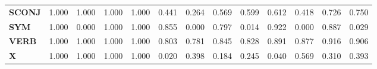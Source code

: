 \begin{table}
\begin{tabular}{|l||l||l||l||l||l||l||l||l||l||l||l||l|}
\textbf{SCONJ} & 1.000 & 1.000 & 1.000 & 1.000 & 0.441 & 0.264 & 0.569 & 0.599 & 0.612 & 0.418 & 0.726 & 0.750 \\
\textbf{SYM} & 1.000 & 0.000 & 1.000 & 1.000 & 0.855 & 0.000 & 0.797 & 0.014 & 0.922 & 0.000 & 0.887 & 0.029 \\
\textbf{VERB} & 1.000 & 1.000 & 1.000 & 1.000 & 0.803 & 0.781 & 0.845 & 0.828 & 0.891 & 0.877 & 0.916 & 0.906 \\
\textbf{X} & 1.000 & 1.000 & 1.000 & 1.000 & 0.020 & 0.398 & 0.184 & 0.245 & 0.040 & 0.569 & 0.310 & 0.393 \\
\bottomrule
\end{tabular}
\end{table}
